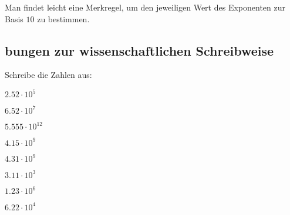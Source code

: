 \documentclass[
twoside,%
ngerman,%
headsepline%
11pt]%
{article}
\begin{document}
\begin{bem}
Man findet leicht eine Merkregel, um den jeweiligen Wert des Exponenten zur Basis $10$ zu bestimmen.
\end{bem}

\subsection{bungen zur wissenschaftlichen Schreibweise}

\begin{ueb}[expand]
  Schreibe die Zahlen aus:
  \\[2.5ex]\hspace*{2.7ex}
  \begin{minipage}{0.4\textwidth}
    \begin{enumeratea}
      \item $2.52\cdot10^{5}$
      \item $6.52\cdot10^{7}$
      \item $5.555\cdot10^{12}$
      \item $4.15\cdot10^{9}$\\[1ex]
    \end{enumeratea}
  \end{minipage}
  \begin{minipage}{0.23\textwidth}
    \begin{enumeratea}\addtocounter{enumi}{4}
      \item $4.31\cdot10^{9}$
      \item $3.11\cdot10^{3}$
      \item $1.23\cdot10^{6}$
      \item $6.22\cdot10^{4}$\\[1ex]
    \end{enumeratea}
  \end{minipage}
\end{ueb}
\end{document}
